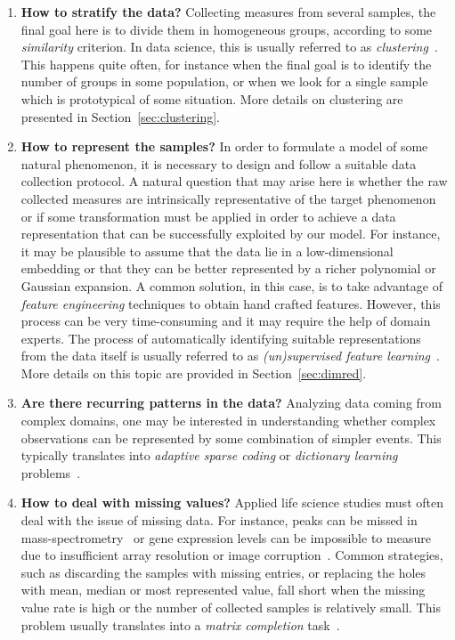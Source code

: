 \begin{enumerate}
	\item[] \textbf{How to stratify the data?}
	Collecting measures from several samples, the final goal here is to divide them in homogeneous groups, according to some \textit{similarity} criterion. In data science, this is usually referred to as \textit{clustering}~\cite{hastie2009elements}.
	This happens quite often, for instance when the final goal is to identify the number of groups in some population, or when we look for a single sample which is prototypical of some situation. More details on clustering are presented in Section~\ref{sec:clustering}.
	
	\item[] \textbf{How to represent the samples?}
	In order to formulate a model of some natural phenomenon, it is necessary to design and follow a suitable data collection protocol. A natural question that may arise here is whether the raw collected measures are intrinsically representative of the target phenomenon or if some transformation must be applied in order to achieve a data representation that can be successfully exploited by our model. For instance, it may be plausible to assume that the data lie in a low-dimensional embedding or that they can be better represented by a richer polynomial or Gaussian expansion.
	A common solution, in this case, is to take advantage of \textit{feature engineering} techniques to obtain hand crafted features. However, this process can be very time-consuming and it may require the help of domain experts. The process of automatically identifying suitable representations from the data itself is usually referred to as \textit{(un)supervised feature learning}~\cite{angermueller2016deep, mamoshina2016applications}. More details on this topic are provided in Section~\ref{sec:dimred}.
	
	
	\item[] \textbf{Are there recurring patterns in the data?}
	Analyzing data coming from complex domains, one may be interested in understanding whether complex observations can be represented by some combination of simpler events. This typically translates into \textit{adaptive sparse coding} or \textit{dictionary learning} problems~\cite{masecchia2015genome, alexandrov2013signatures}.
	
	
	\item[] \textbf{How to deal with missing values?}
	Applied life science studies must often deal with the issue of missing data. For instance, peaks can be missed in mass-spectrometry~\cite{jung2014adaption} or gene expression levels can be impossible to measure due to insufficient array resolution or image corruption~\cite{stekhoven2011missforest, troyanskaya2001missing}. Common strategies, such as discarding the samples with missing entries, or replacing the holes with mean, median or most represented value, fall short when the missing value rate is high or the number of collected samples is relatively small. This problem usually translates into a \textit{matrix completion} task~\cite{candes2009exact}.
	
\end{enumerate}


